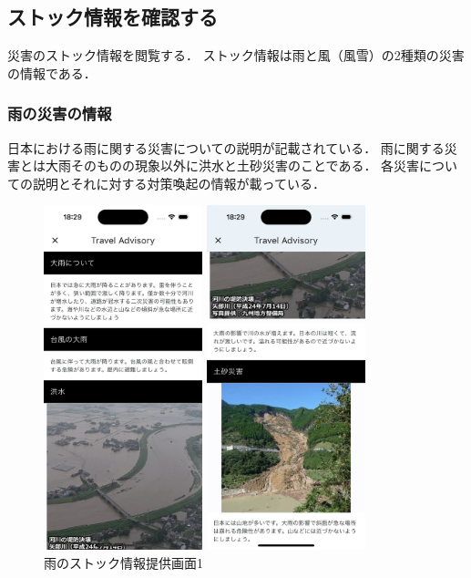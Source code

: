 \subsection {ストック情報を確認する}
災害のストック情報を閲覧する．
ストック情報は雨と風（風雪）の2種類の災害の情報である．

\subsubsection {雨の災害の情報}
日本における雨に関する災害についての説明が記載されている．
雨に関する災害とは大雨そのものの現象以外に洪水と土砂災害のことである．
各災害についての説明とそれに対する対策喚起の情報が載っている．

\begin{figure}[H]
  \begin{minipage}[b]{0.45\linewidth}
    \centering
    \includegraphics[height=10cm]{./fig/rain_stock_1.png}
    \caption{雨のストック情報提供画面1}
    \label{fig:rain_stock_1}
  \end{minipage}
  \begin{minipage}[b]{0.45\linewidth}
    \centering
    \includegraphics[height=10cm]{./fig/rain_stock_2.png}

\end{minipage}
\end{figure}
